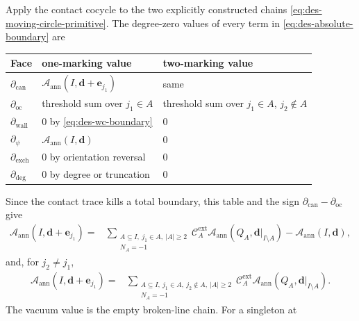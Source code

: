 Apply the contact cocycle to the two explicitly constructed chains
\eqref{eq:des-moving-circle-primitive}.  The degree-zero values of every
term in \eqref{eq:des-absolute-boundary} are
\begin{center}
\begin{tabularx}{\textwidth}{@{}
 >{\raggedright\arraybackslash}p{}
 >{\raggedright\arraybackslash}p{}
 >{\raggedright\arraybackslash}X@{}}
\toprule
Face & one-marking value & two-marking value\\
\midrule
$\partial_{\mathrm{can}}$ &
$\mathcal A_{\mathrm{ann}}(I,\mathbf d+\mathbf e_{j_1})$ & same\\
$\partial_{\mathrm{oc}}$ & threshold sum over $j_1\in A$ & threshold sum over $j_1\in A$, $j_2\notin A$\\
$\partial_{\mathrm{wall}}$ & $0$ by \eqref{eq:des-wc-boundary} & $0$\\
$\partial_{\psi}$ & $\mathcal A_{\mathrm{ann}}(I,\mathbf d)$ & $0$\\
$\partial_{\mathrm{exch}}$ & $0$ by orientation reversal & $0$\\
$\partial_{\mathrm{deg}}$ & $0$ by degree or truncation & $0$\\
\bottomrule
\end{tabularx}
\end{center}
Since the contact trace kills a total boundary, this table and the sign
$\partial_{\mathrm{can}}-\partial_{\mathrm{oc}}$ give
\begin{equation}
\begin{aligned}
 \mathcal A_{\mathrm{ann}}(I,\mathbf d+\mathbf e_{j_1})
 ={}&\sum_{\substack{A\subseteq I,\ j_1\in A,\ |A|\geq2\\N_A=-1}}
 \mathcal C_A^{\mathrm{ext}}
 \mathcal A_{\mathrm{ann}}(Q_A,\mathbf d|_{I\setminus A})
 -\mathcal A_{\mathrm{ann}}(I,\mathbf d),
\end{aligned}
\label{eq:des-qone}
\end{equation}
and, for $j_2\ne j_1$,
\begin{equation}
\begin{aligned}
 \mathcal A_{\mathrm{ann}}(I,\mathbf d+\mathbf e_{j_1})
 ={}&\sum_{\substack{A\subseteq I,\ j_1\in A,\ j_2\notin A,
                         \ |A|\geq2\\N_A=-1}}
 \mathcal C_A^{\mathrm{ext}}
 \mathcal A_{\mathrm{ann}}(Q_A,\mathbf d|_{I\setminus A}).
\end{aligned}
\label{eq:des-qtwo}
\end{equation}
The vacuum value is the empty broken-line chain.  For a singleton at
